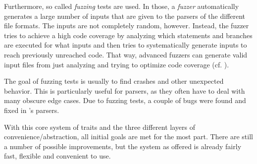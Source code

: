 Furthermore, so called \emph{fuzzing} tests are used.
In those, a \emph{fuzzer} automatically generates a large number of inputs that are given to the parsers of the different file formats.
The inputs are not completely random, however.
Instead, the fuzzer tries to achieve a high code coverage by analyzing which statements and branches are executed for what inputs and then tries to systematically generate inputs to reach previously unreached code.
That way, advanced fuzzers can generate valid input files from just analyzing and trying to optimize code coverage (cf. \cite{jpegfuzzing}).

The goal of fuzzing tests is usually to find crashes and other unexpected behavior.
This is particularly useful for parsers, as they often have to deal with many obscure edge cases.
Due to fuzzing tests, a couple of bugs were found and fixed in 's parsers.



\vspace{1.5cm}


With this core system of traits and the three different layers of convenience/abstraction, all initial goals are met for the most part.
There are still a number of possible improvements, but the system as offered is already fairly fast, flexible and convenient to use.
\vspace{6mm}
